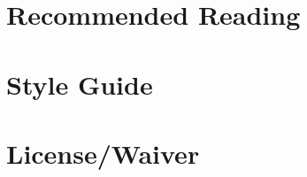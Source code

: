 \documentclass[ebook, 12pt, twoside]{memoir}
\let\sc\scshape
\let\sc\scshape
\begin{document}
\chapter[\textbf{Recommended Reading}]{Recommended Reading}
%

%
\chapter[\textbf{Style Guide}]{Style Guide}
%

%
%
%



\newpage
\chapter[\textbf{License/Waiver}]{License/Waiver}

%
\pagestyle{empty} \thispagestyle{empty}
\clearpage\mbox{}\clearpage\mbox{}\clearpage\mbox{}\clearpage    %
\end{document}
